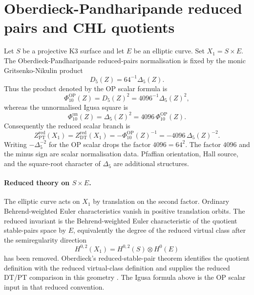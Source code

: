 
\providecommand{\C}{\mathbb{C}}
\providecommand{\Z}{\mathbb{Z}}
\providecommand{\cO}{\mathcal{O}}
\providecommand{\ZredPT}{Z^{\mathrm{red}}_{\mathrm{PT}}}
\providecommand{\ZredDT}{Z^{\mathrm{red}}_{\mathrm{DT}}}
\providecommand{\kBKM}{\kappa_{\mathrm{BKM}}}
\providecommand{\kcat}{\kappa_{\mathrm{cat}}}
\providecommand{\kch}{\kappa_{\mathrm{ch}}}
\providecommand{\kchcomp}{\kappa_{\mathrm{ch}}^{\mathrm{comp}}}
\providecommand{\kchHeis}{\kappa_{\mathrm{ch}}^{\mathrm{Heis}}}
\providecommand{\kfib}{\kappa_{\mathrm{fiber}}}
\providecommand{\PhiOP}{\Phi_{10}^{\mathrm{OP}}}
\providecommand{\Phiun}{\Phi_{10}^{\mathrm{un}}}
\providecommand{\PhiN}{\Phi_N}

\section*{Oberdieck-Pandharipande reduced pairs and CHL quotients}

Let $S$ be a projective K3 surface and let $E$ be an elliptic curve.
Set $X_1=S\times E$.  The Oberdieck-Pandharipande reduced-pairs
normalisation is fixed by the monic Gritsenko-Nikulin product
\cite{OberdieckPandharipande2018,GritsenkoNikulin1998}
\[
  D_5(Z)=64^{-1}\Delta_5(Z).
\]
Thus the product denoted by the OP scalar formula is
\[
  \PhiOP(Z)=D_5(Z)^2
  =4096^{-1}\Delta_5(Z)^2,
\]
whereas the unnormalised Igusa square is
\[
  \Phiun(Z)=\Delta_5(Z)^2=4096\,\PhiOP(Z).
\]
Consequently the reduced scalar branch is
\[
  \ZredPT(X_1)=\ZredDT(X_1)
  =-\PhiOP(Z)^{-1}
  =-4096\,\Delta_5(Z)^{-2}.
\]
Writing $-\Delta_5^{-2}$ for the OP scalar drops the factor
$4096=64^2$.  The factor $4096$ and the minus sign are scalar
normalisation data.  Pfaffian orientation, Hall source, and the
square-root character of $\Delta_5$ are additional structures.

\paragraph{Reduced theory on $S\times E$.}
The elliptic curve acts on $X_1$ by translation on the second factor.
Ordinary Behrend-weighted Euler characteristics vanish in positive
translation orbits.  The reduced invariant is the Behrend-weighted
Euler characteristic of the quotient stable-pairs space by $E$,
equivalently the degree of the reduced virtual class after the
semiregularity direction
\[
  H^{0,2}(X_1)=H^{0,2}(S)\otimes H^0(E)
\]
has been removed.  Oberdieck's reduced-stable-pair theorem identifies
the quotient definition with the reduced virtual-class definition and
supplies the reduced DT/PT comparison in this geometry
\cite{OberdieckPandharipande2018,Oberdieck2017}.  The Igusa formula
above is the OP scalar input in that reduced convention.

